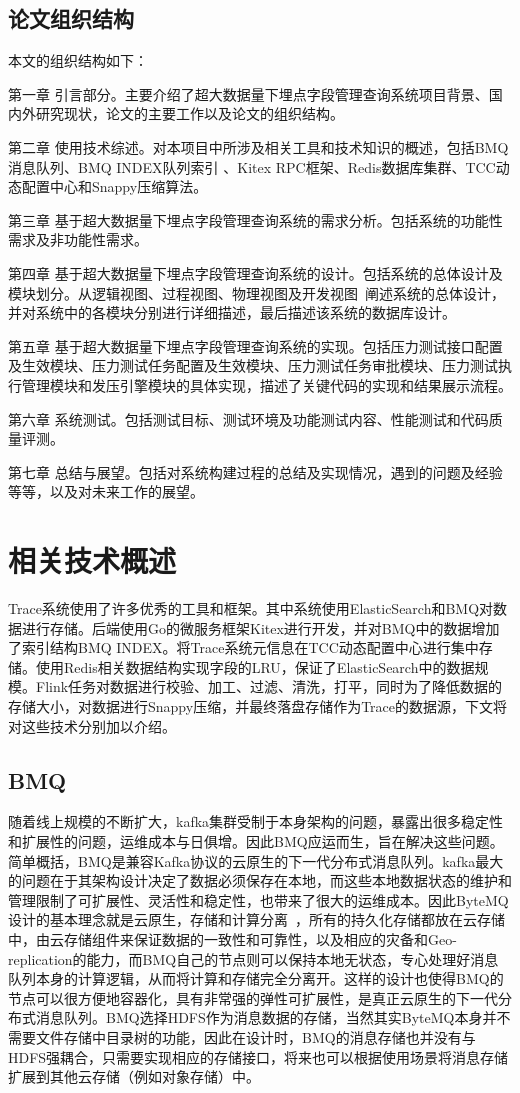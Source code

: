 \section{论文组织结构}
本文的组织结构如下：

第一章 引言部分。主要介绍了超大数据量下埋点字段管理查询系统项目背景、国内外研究现状，论文的主要工作以及论文的组织结构。

第二章 使用技术综述。对本项目中所涉及相关工具和技术知识的概述，包括BMQ消息队列、BMQ INDEX队列索引 、Kitex RPC框架、Redis数据库集群、TCC动态配置中心和Snappy压缩算法。

第三章 基于超大数据量下埋点字段管理查询系统的需求分析。包括系统的功能性需求及非功能性需求。

第四章 基于超大数据量下埋点字段管理查询系统的设计。包括系统的总体设计及模块划分。从逻辑视图、过程视图、物理视图及开发视图~\cite{kruchten19954+}阐述系统的总体设计，并对系统中的各模块分别进行详细描述，最后描述该系统的数据库设计。

第五章 基于超大数据量下埋点字段管理查询系统的实现。包括压力测试接口配置及生效模块、压力测试任务配置及生效模块、压力测试任务审批模块、压力测试执行管理模块和发压引擎模块的具体实现，描述了关键代码的实现和结果展示流程。

第六章 系统测试。包括测试目标、测试环境及功能测试内容、性能测试和代码质量评测。

第七章 总结与展望。包括对系统构建过程的总结及实现情况，遇到的问题及经验等等，以及对未来工作的展望。 
\chapter{相关技术概述}
Trace系统使用了许多优秀的工具和框架。其中系统使用ElasticSearch和BMQ对数据进行存储。后端使用Go的微服务框架Kitex进行开发，并对BMQ中的数据增加了索引结构BMQ INDEX。将Trace系统元信息在TCC动态配置中心进行集中存储。使用Redis相关数据结构实现字段的LRU，保证了ElasticSearch中的数据规模。Flink任务对数据进行校验、加工、过滤、清洗，打平，同时为了降低数据的存储大小，对数据进行Snappy压缩，并最终落盘存储作为Trace的数据源，下文将对这些技术分别加以介绍。
\section{BMQ}
随着线上规模的不断扩大，kafka集群受制于本身架构的问题，暴露出很多稳定性和扩展性的问题，运维成本与日俱增。因此BMQ应运而生，旨在解决这些问题。简单概括，BMQ是兼容Kafka协议的云原生的下一代分布式消息队列。kafka最大的问题在于其架构设计决定了数据必须保存在本地，而这些本地数据状态的维护和管理限制了可扩展性、灵活性和稳定性，也带来了很大的运维成本。因此ByteMQ设计的基本理念就是云原生，存储和计算分离~\cite{吴金坛2020大数据计算与存储分离技术实验分析}，所有的持久化存储都放在云存储中，由云存储组件来保证数据的一致性和可靠性，以及相应的灾备和Geo-replication的能力，而BMQ自己的节点则可以保持本地无状态，专心处理好消息队列本身的计算逻辑，从而将计算和存储完全分离开。这样的设计也使得BMQ的节点可以很方便地容器化，具有非常强的弹性可扩展性，是真正云原生的下一代分布式消息队列。BMQ选择HDFS作为消息数据的存储，当然其实ByteMQ本身并不需要文件存储中目录树的功能，因此在设计时，BMQ的消息存储也并没有与HDFS强耦合，只需要实现相应的存储接口，将来也可以根据使用场景将消息存储扩展到其他云存储（例如对象存储）中。

